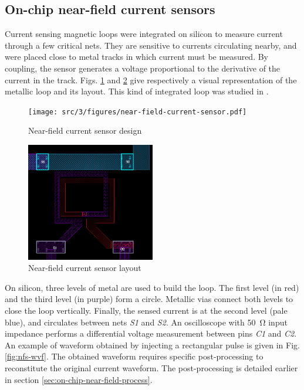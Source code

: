\subsection{On-chip near-field current sensors}

Current sensing magnetic loops were integrated on silicon to measure current through a few critical nets.
They are sensitive to currents circulating nearby, and were placed close to metal tracks in which current must be measured.
By coupling, the sensor generates a voltage proportional to the derivative of the current in the track.
Figs. \ref{fig:near-field-current-sensor} and \ref{fig:near-field-current-sensor-layout} give respectively a visual representation of the metallic loop and its layout.
This kind of integrated loop was studied in \cite{OtherInductors, InductorsLAAS1, InductorsLAAS2, AlainSallesInductors}.

\begin{figure}[!h]
  \centering
  \texttt{[image: src/3/figures/near-field-current-sensor.pdf]}
  \caption{Near-field current sensor design}
  \label{fig:near-field-current-sensor}
\end{figure}

\begin{figure}[!h]
  \centering
  \includegraphics[width=0.5\textwidth]{src/3/figures/sensor_layout.png}
  \caption{Near-field current sensor layout}
  \label{fig:near-field-current-sensor-layout}
\end{figure}

On silicon, three levels of metal are used to build the loop.
The first level (in red) and the third level (in purple) form a circle.
Metallic vias connect both levels to close the loop vertically.
Finally, the sensed current is at the second level (pale blue), and circulates between nets \textit{S1} and \textit{S2}.
An oscilloscope with \SI{50}{\ohm} input impedance performs a differential voltage measurement between pins \textit{C1} and \textit{C2}.
An example of waveform obtained by injecting a rectangular pulse is given in Fig. \ref{fig:nfs-wvf}.
The obtained waveform requires specific post-processing to reconstitute the original current waveform.
The post-processing is detailed earlier in section \ref{sec:on-chip-near-field-process}.

